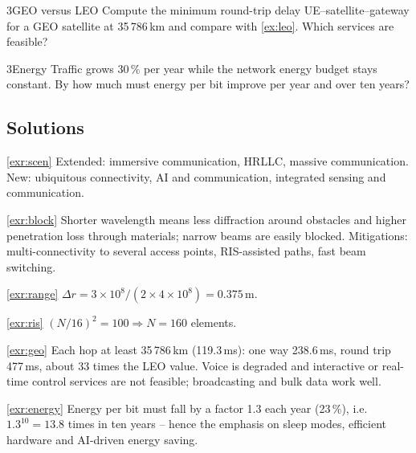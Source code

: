 \documentclass[11pt,a4paper]{article}
\begin{document}
\begin{exercisebox}{3}{GEO versus LEO}\label{exr:geo}
Compute the minimum round-trip delay UE--satellite--gateway for a GEO satellite at 35\,786\,km and compare with \cref{ex:leo}. Which services are feasible?
\end{exercisebox}

\begin{exercisebox}{3}{Energy}\label{exr:energy}
Traffic grows 30\,\% per year while the network energy budget stays constant. By how much must energy per bit improve per year and over ten years?
\end{exercisebox}

\subsection*{Solutions}

\begin{solutionbox}{\ref{exr:scen}}
Extended: immersive communication, HRLLC, massive communication. New: ubiquitous connectivity, AI and communication, integrated sensing and communication.
\end{solutionbox}

\begin{solutionbox}{\ref{exr:block}}
Shorter wavelength means less diffraction around obstacles and higher penetration loss through materials; narrow beams are easily blocked. Mitigations:
multi-connectivity to several access points, RIS-assisted paths, fast beam switching.
\end{solutionbox}

\begin{solutionbox}{\ref{exr:range}}
$\Delta r = 3\times10^{8}/(2\times4\times10^{8}) = 0.375$\,m.
\end{solutionbox}

\begin{solutionbox}{\ref{exr:ris}}
$(N/16)^2 = 100 \Rightarrow N = 160$ elements.
\end{solutionbox}

\begin{solutionbox}{\ref{exr:geo}}
Each hop at least 35\,786\,km (119.3\,ms): one way 238.6\,ms, round trip 477\,ms, about 33 times the LEO value. Voice is degraded and interactive or
real-time control services are not feasible; broadcasting and bulk data work well.
\end{solutionbox}

\begin{solutionbox}{\ref{exr:energy}}
Energy per bit must fall by a factor 1.3 each year (23\,\%), i.e.\ $1.3^{10} = 13.8$ times in ten years -- hence the emphasis on sleep modes, efficient
hardware and AI-driven energy saving.
\end{solutionbox}
\end{document}
